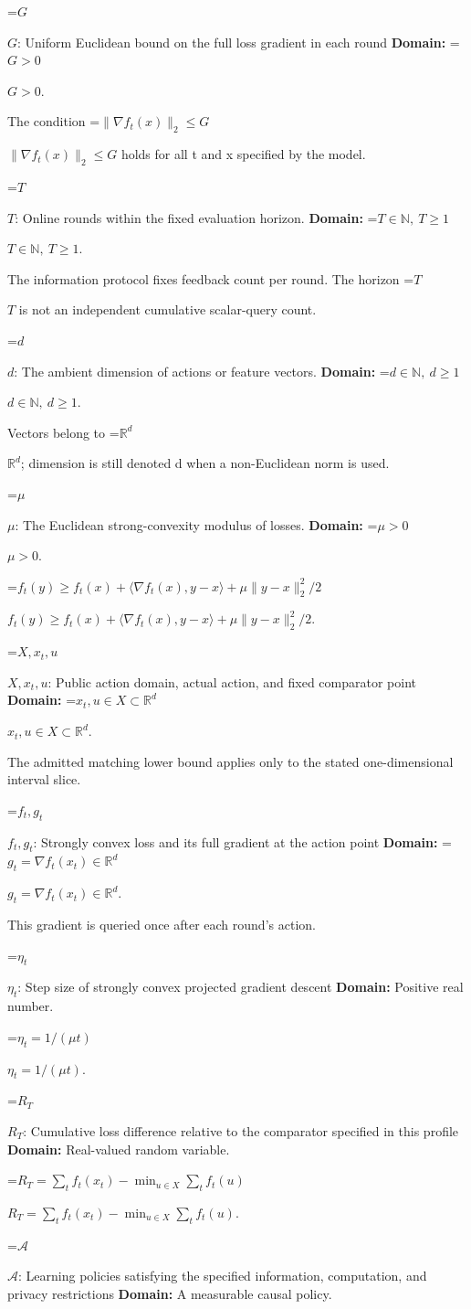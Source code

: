 \documentclass[10pt,a4paper]{article}
\newcommand{\AtlasMath}[1]{\par\begingroup\centering\setbox0=\hbox{$\displaystyle #1$}\ifdim\wd0>1.4\linewidth\typeout{ATLAS WIDE FORMULA: \the\wd0}\fi\ifdim\wd0>\linewidth\resizebox{\linewidth}{!}{\box0}\else\box0\fi\par\endgroup}
\newcommand{\AtlasInlineMath}[1]{\begingroup\setbox0=\hbox{$#1$}\ifdim\wd0>.4\linewidth\endgroup\AtlasMath{#1}\else\endgroup$#1$\fi}
\begin{document}
\AtlasInlineMath{G}: Uniform Euclidean bound on the full loss gradient in each round \textbf{Domain:} \AtlasInlineMath{G>0}.

The condition \AtlasInlineMath{\|\nabla f_t(x)\|_2\le G} holds for all t and x specified by the model.

\AtlasInlineMath{T}: Online rounds within the fixed evaluation horizon. \textbf{Domain:} \AtlasInlineMath{T\in\mathbb N,\ T\ge1}.

The information protocol fixes feedback count per round. The horizon \AtlasInlineMath{T} is not an independent cumulative scalar-query count.

\AtlasInlineMath{d}: The ambient dimension of actions or feature vectors. \textbf{Domain:} \AtlasInlineMath{d\in\mathbb N,\ d\ge1}.

Vectors belong to \AtlasInlineMath{\mathbb R^d}; dimension is still denoted d when a non-Euclidean norm is used.

\AtlasInlineMath{\mu}: The Euclidean strong-convexity modulus of losses. \textbf{Domain:} \AtlasInlineMath{\mu>0}.

\AtlasInlineMath{f_t(y)\ge f_t(x)+\langle\nabla f_t(x),y-x\rangle+\mu\|y-x\|_2^2/2}.

\AtlasInlineMath{X,x_t,u}: Public action domain, actual action, and fixed comparator point \textbf{Domain:} \AtlasInlineMath{x_t,u\in X\subset\mathbb R^d}.

The admitted matching lower bound applies only to the stated one-dimensional interval slice.

\AtlasInlineMath{f_t,g_t}: Strongly convex loss and its full gradient at the action point \textbf{Domain:} \AtlasInlineMath{g_t=\nabla f_t(x_t)\in\mathbb R^d}.

This gradient is queried once after each round's action.

\AtlasInlineMath{\eta_t}: Step size of strongly convex projected gradient descent \textbf{Domain:} Positive real number.

\AtlasInlineMath{\eta_t=1/(\mu t)}.

\AtlasInlineMath{R_T}: Cumulative loss difference relative to the comparator specified in this profile \textbf{Domain:} Real-valued random variable.

\AtlasInlineMath{R_T=\sum_tf_t(x_t)-\min_{u\in X}\sum_tf_t(u)}.

\AtlasInlineMath{\mathcal A}: Learning policies satisfying the specified information, computation, and privacy restrictions \textbf{Domain:} A measurable causal policy.
\end{document}

